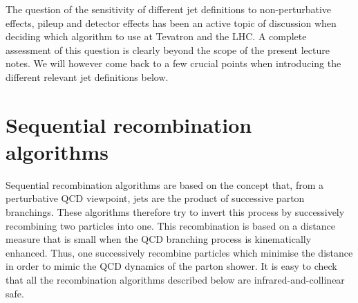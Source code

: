 The question of the sensitivity of different jet definitions to
non-perturbative effects, pileup and detector effects has been an
active topic of discussion when deciding which algorithm to use at
Tevatron and the LHC. A complete assessment of this question is
clearly beyond the scope of the present lecture notes. We will however
come back to a few crucial points when introducing the different
relevant jet definitions below.


\section{Sequential recombination algorithms}\label{sec:jetalgs-recombination}

Sequential recombination algorithms are based on the concept that,
from a perturbative QCD viewpoint, jets are the product of successive
parton branchings. These algorithms therefore try to invert this
process by successively recombining two particles into one. This
recombination is based on a distance measure that is small when the
QCD branching process is kinematically enhanced. Thus, one
successively recombine particles which minimise the distance in order
to mimic the QCD dynamics of the parton shower.
%
It is easy to check that all the recombination algorithms described
below are infrared-and-collinear safe.

